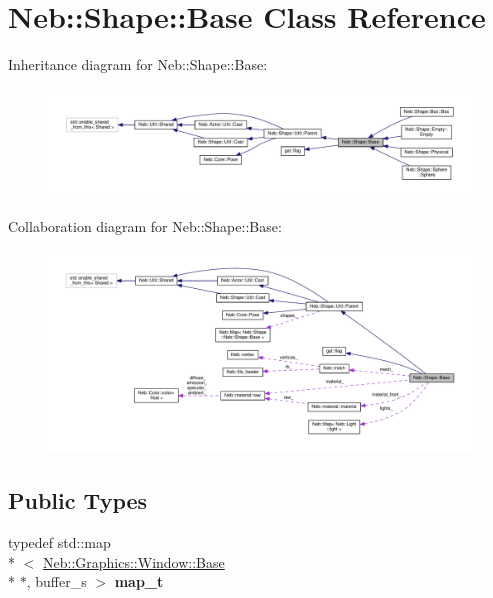 \hypertarget{classNeb_1_1Shape_1_1Base}{\section{Neb\-:\-:Shape\-:\-:Base Class Reference}
\label{classNeb_1_1Shape_1_1Base}
}


Inheritance diagram for Neb\-:\-:Shape\-:\-:Base\-:
\nopagebreak
\begin{figure}[H]
\begin{center}
\leavevmode
\includegraphics[width=350pt]{classNeb_1_1Shape_1_1Base__inherit__graph}
\end{center}
\end{figure}


Collaboration diagram for Neb\-:\-:Shape\-:\-:Base\-:
\nopagebreak
\begin{figure}[H]
\begin{center}
\leavevmode
\includegraphics[width=350pt]{classNeb_1_1Shape_1_1Base__coll__graph}
\end{center}
\end{figure}
\subsection*{Public Types}
\begin{DoxyCompactItemize}
\item 
\hypertarget{classNeb_1_1Shape_1_1Base_a3b7d09a29f7f70894012e5ec8f27018e}{typedef std\-::map\\*
$<$ \hyperlink{classNeb_1_1Graphics_1_1Window_1_1Base}{Neb\-::\-Graphics\-::\-Window\-::\-Base} \\*
$\ast$, buffer\-\_\-s $>$ {\bfseries map\-\_\-t}}\label{classNeb_1_1Shape_1_1Base_a3b7d09a29f7f70894012e5ec8f27018e}

\end{DoxyCompactItemize}
